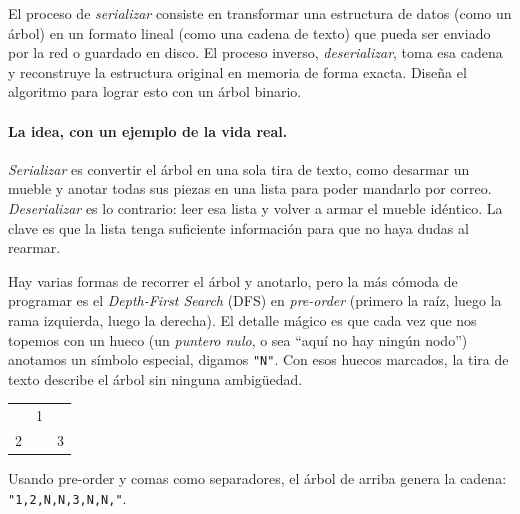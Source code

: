 
El proceso de \emph{serializar} consiste en transformar una estructura de datos
(como un árbol) en un formato lineal (como una cadena de texto) que pueda ser
enviado por la red o guardado en disco. El proceso inverso,
\emph{deserializar}, toma esa cadena y reconstruye la estructura original en
memoria de forma exacta. Diseña el algoritmo para lograr esto con un árbol binario.

\paragraph{La idea, con un ejemplo de la vida real.} \emph{Serializar} es
convertir el árbol en una sola tira de texto, como desarmar un mueble y anotar
todas sus piezas en una lista para poder mandarlo por correo. \emph{Deserializar}
es lo contrario: leer esa lista y volver a armar el mueble idéntico. La clave es
que la lista tenga suficiente información para que no haya dudas al rearmar.

Hay varias formas de recorrer el árbol y anotarlo, pero la más cómoda de
programar es el \emph{Depth-First Search} (DFS) en \emph{pre-order} (primero la raíz, luego la
rama izquierda, luego la derecha). El detalle mágico es que cada vez que nos
topemos con un hueco (un \emph{puntero nulo}, o sea ``aquí no hay ningún nodo'')
anotamos un símbolo especial, digamos \texttt{"N"}. Con esos huecos marcados, la
tira de texto describe el árbol sin ninguna ambigüedad.

\begin{center}
\ttfamily
\begin{tabular}{ccc}
 & 1 & \\
2 & & 3\\
\end{tabular}
\end{center}

\noindent Usando pre-order y comas como separadores, el árbol de arriba genera
la cadena: \texttt{"1,2,N,N,3,N,N,"}.

